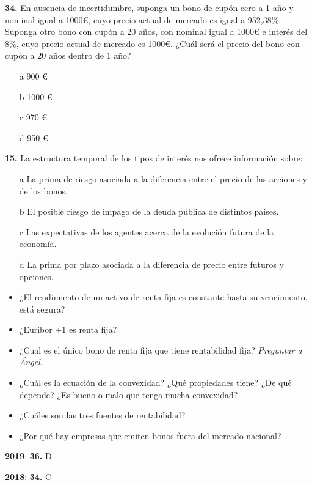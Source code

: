 \documentclass{nuevotema}
\begin{document}
\textbf{34.} En ausencia de incertidumbre, suponga un bono de cupón cero a 1 año y nominal igual a 1000€, cuyo precio actual de mercado es igual a 952,38\%. Suponga otro bono con cupón a 20 años, con nominal igual a 1000€ e interés del 8\%, cuyo precio actual de mercado es 1000€. ¿Cuál será el precio del bono con cupón a 20 años dentro de 1 año?
\begin{enumerate}
	\item[a] 900 €
	\item[b] 1000 €
	\item[c] 970 €
	\item[d] 950 €
\end{enumerate}

\textbf{15.} La estructura temporal de los tipos de interés nos ofrece información sobre:
\begin{enumerate}
	\item[a] La prima de riesgo asociada a la diferencia entre el precio de las acciones y de los bonos.
	\item[b] El posible riesgo de impago de la deuda pública de distintos países.
	\item[c] Las expectativas de los agentes acerca de la evolución futura de la economía.
	\item[d] La prima por plazo asociada a la diferencia de precio entre futuros y opciones.
\end{enumerate}


\begin{itemize}
    \item ¿El rendimiento de un activo de renta fija es constante hasta su vencimiento, está segura?
    \item ¿Euribor +1 es renta fija?
    \item ¿Cual es el único bono de renta fija que tiene rentabilidad fija? \textit{Preguntar a Ángel}.
    \item ¿Cuál es la ecuación de la convexidad? ¿Qué propiedades tiene? ¿De qué depende? ¿Es bueno o malo que tenga mucha convexidad?
    \item ¿Cuáles son las tres fuentes de rentabilidad?
    \item ¿Por qué hay empresas que emiten bonos fuera del mercado nacional?
\end{itemize}

\notas

\textbf{2019}: \textbf{36.} D

\textbf{2018}: \textbf{34.} C
\end{document}
